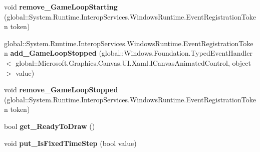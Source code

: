 \begin{DoxyCompactItemize}
\item 
\mbox{\label{interface_microsoft_1_1_graphics_1_1_canvas_1_1_u_i_1_1_xaml_1_1_i_canvas_animated_control_ae7d786b9e08eabd196fd8d0dcd993a9b}} 
void {\bfseries remove\+\_\+\+Game\+Loop\+Starting} (global\+::\+System.\+Runtime.\+Interop\+Services.\+Windows\+Runtime.\+Event\+Registration\+Token token)
\item 
\mbox{\label{interface_microsoft_1_1_graphics_1_1_canvas_1_1_u_i_1_1_xaml_1_1_i_canvas_animated_control_a47c0db742873551ad530322dc7d89abe}} 
global\+::\+System.\+Runtime.\+Interop\+Services.\+Windows\+Runtime.\+Event\+Registration\+Token {\bfseries add\+\_\+\+Game\+Loop\+Stopped} (global\+::\+Windows.\+Foundation.\+Typed\+Event\+Handler$<$ global\+::\+Microsoft.\+Graphics.\+Canvas.\+U\+I.\+Xaml.\+I\+Canvas\+Animated\+Control, object $>$ value)
\item 
\mbox{\label{interface_microsoft_1_1_graphics_1_1_canvas_1_1_u_i_1_1_xaml_1_1_i_canvas_animated_control_a712a4a579c4ee72d0f88076a7972ed96}} 
void {\bfseries remove\+\_\+\+Game\+Loop\+Stopped} (global\+::\+System.\+Runtime.\+Interop\+Services.\+Windows\+Runtime.\+Event\+Registration\+Token token)
\item 
\mbox{\label{interface_microsoft_1_1_graphics_1_1_canvas_1_1_u_i_1_1_xaml_1_1_i_canvas_animated_control_a55659f2be58522d653037abfc96493be}} 
bool {\bfseries get\+\_\+\+Ready\+To\+Draw} ()
\item 
\mbox{\label{interface_microsoft_1_1_graphics_1_1_canvas_1_1_u_i_1_1_xaml_1_1_i_canvas_animated_control_a0aa1114cc8b3a258c6e0616510d2336a}} 
void {\bfseries put\+\_\+\+Is\+Fixed\+Time\+Step} (bool value)
\item 
\mbox{\label{interface_microsoft_1_1_graphics_1_1_canvas_1_1_u_i_1_1_xaml_1_1_i_canvas_animated_control_a6bb0ecf62c64fe57dd92ae5a630e76b4}} 

\end{DoxyCompactItemize}
